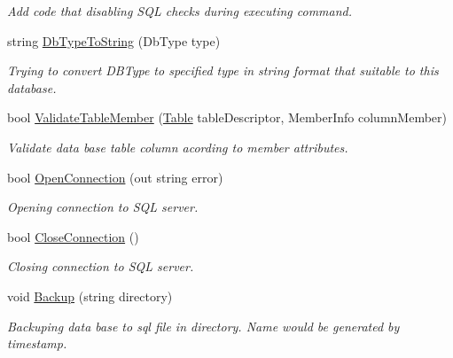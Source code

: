 \begin{DoxyCompactItemize}
\begin{DoxyCompactList}\small\item\em Add code that disabling S\+QL checks during executing command. \end{DoxyCompactList}\item 
string \mbox{\hyperlink{interface_uniform_data_operator_1_1_sql_1_1_i_sql_operator_a51af40df39808d53cdcc81852b836634}{Db\+Type\+To\+String}} (Db\+Type type)
\begin{DoxyCompactList}\small\item\em Trying to convert D\+B\+Type to specified type in string format that suitable to this database. \end{DoxyCompactList}\item 
bool \mbox{\hyperlink{interface_uniform_data_operator_1_1_sql_1_1_i_sql_operator_a3b5fbe97e664e1ef689576ab8757f957}{Validate\+Table\+Member}} (\mbox{\hyperlink{class_uniform_data_operator_1_1_sql_1_1_attributes_1_1_table}{Table}} table\+Descriptor, Member\+Info column\+Member)
\begin{DoxyCompactList}\small\item\em Validate data base table column acording to member attributes. \end{DoxyCompactList}\item 
bool \mbox{\hyperlink{interface_uniform_data_operator_1_1_sql_1_1_i_sql_operator_a6fc9e5efd1e21ae9998b9c56ae9e347c}{Open\+Connection}} (out string error)
\begin{DoxyCompactList}\small\item\em Opening connection to S\+QL server. \end{DoxyCompactList}\item 
bool \mbox{\hyperlink{interface_uniform_data_operator_1_1_sql_1_1_i_sql_operator_a1a6429996e1bbb452f4e034fd634e640}{Close\+Connection}} ()
\begin{DoxyCompactList}\small\item\em Closing connection to S\+QL server. \end{DoxyCompactList}\item 
void \mbox{\hyperlink{interface_uniform_data_operator_1_1_sql_1_1_i_sql_operator_a096be4f746c1fcbb8b2894c2517b937c}{Backup}} (string directory)
\begin{DoxyCompactList}\small\item\em Backuping data base to sql file in directory. Name would be generated by timestamp. \end{DoxyCompactList}\item 

\end{DoxyCompactItemize}

